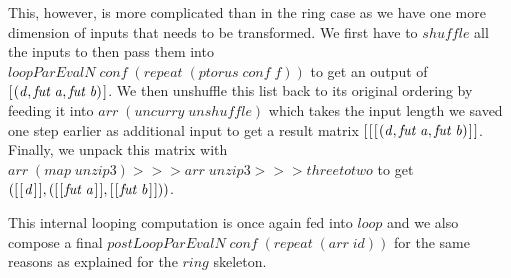 \documentclass{jfp1}
\newcommand{\Varid}[1]{\mathit{#1}}
\begin{document}
This, however, is more complicated than in the ring case as we have one more dimension of inputs that needs to be transformed. We first have to \ensuremath{\Varid{shuffle}} all the inputs to then pass them into \ensuremath{\Varid{loopParEvalN}\;\Varid{conf}\;(\Varid{repeat}\;(\Varid{ptorus}\;\Varid{conf}\;\Varid{f}))} to get an output of \ensuremath{[\mskip1.5mu (\Varid{d},\Varid{fut}\;\Varid{a},\Varid{fut}\;\Varid{b})\mskip1.5mu]}. We then unshuffle this list back to its original ordering by feeding it into \ensuremath{\Varid{arr}\;(\Varid{uncurry}\;\Varid{unshuffle})} which takes the input length we saved one step earlier as additional input to get a result matrix \ensuremath{[\mskip1.5mu [\mskip1.5mu [\mskip1.5mu (\Varid{d},\Varid{fut}\;\Varid{a},\Varid{fut}\;\Varid{b})\mskip1.5mu]\mskip1.5mu]}. Finally, we unpack this matrix  with \ensuremath{\Varid{arr}\;(\Varid{map}\;\Varid{unzip3})\mathbin{>\!\!>\!\!>}\Varid{arr}\;\Varid{unzip3}\mathbin{>\!\!>\!\!>}\Varid{threetotwo}} to get \ensuremath{([\mskip1.5mu [\mskip1.5mu \Varid{d}\mskip1.5mu]\mskip1.5mu],([\mskip1.5mu [\mskip1.5mu \Varid{fut}\;\Varid{a}\mskip1.5mu]\mskip1.5mu],[\mskip1.5mu [\mskip1.5mu \Varid{fut}\;\Varid{b}\mskip1.5mu]\mskip1.5mu]))}.

This internal looping computation is once again fed into \ensuremath{\Varid{loop}} and we also compose a final \ensuremath{\Varid{postLoopParEvalN}\;\Varid{conf}\;(\Varid{repeat}\;(\Varid{arr}\;\Varid{id}))} for the same reasons as explained for the \ensuremath{\Varid{ring}} skeleton. 
\end{document}
